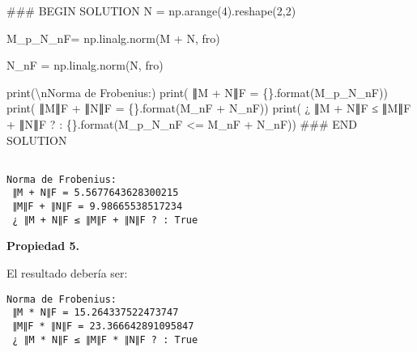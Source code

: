 \documentclass[
  letterpaper,
  DIV=11,
  numbers=noendperiod]{scrreprt}
\newenvironment{Shaded}{\begin{snugshade}}{\end{snugshade}}
\newcommand{\BuiltInTok}[1]{\textcolor[rgb]{0.00,0.23,0.31}{#1}}
\newcommand{\CharTok}[1]{\textcolor[rgb]{0.13,0.47,0.30}{#1}}
\newcommand{\CommentTok}[1]{\textcolor[rgb]{0.37,0.37,0.37}{#1}}
\newcommand{\DecValTok}[1]{\textcolor[rgb]{0.68,0.00,0.00}{#1}}
\newcommand{\NormalTok}[1]{\textcolor[rgb]{0.00,0.23,0.31}{#1}}
\newcommand{\OperatorTok}[1]{\textcolor[rgb]{0.37,0.37,0.37}{#1}}
\newcommand{\RegionMarkerTok}[1]{\textcolor[rgb]{0.00,0.23,0.31}{#1}}
\newcommand{\SpecialCharTok}[1]{\textcolor[rgb]{0.37,0.37,0.37}{#1}}
\newcommand{\StringTok}[1]{\textcolor[rgb]{0.13,0.47,0.30}{#1}}
\begin{document}
\begin{Shaded}
\begin{Highlighting}[]
\CommentTok{\#\#\# }\RegionMarkerTok{BEGIN}\CommentTok{ SOLUTION}
\NormalTok{N }\OperatorTok{=}\NormalTok{ np.arange(}\DecValTok{4}\NormalTok{).reshape(}\DecValTok{2}\NormalTok{,}\DecValTok{2}\NormalTok{)}

\NormalTok{M\_p\_N\_nF}\OperatorTok{=}\NormalTok{ np.linalg.norm(M }\OperatorTok{+}\NormalTok{ N, }\StringTok{\textquotesingle{}fro\textquotesingle{}}\NormalTok{)}

\NormalTok{N\_nF }\OperatorTok{=}\NormalTok{ np.linalg.norm(N, }\StringTok{\textquotesingle{}fro\textquotesingle{}}\NormalTok{)}

\BuiltInTok{print}\NormalTok{(}\StringTok{\textquotesingle{}}\CharTok{\textbackslash{}n}\StringTok{Norma de Frobenius:\textquotesingle{}}\NormalTok{)}
\BuiltInTok{print}\NormalTok{(}\StringTok{\textquotesingle{} ∥M + N∥F = }\SpecialCharTok{\{\}}\StringTok{\textquotesingle{}}\NormalTok{.}\BuiltInTok{format}\NormalTok{(M\_p\_N\_nF))}
\BuiltInTok{print}\NormalTok{(}\StringTok{\textquotesingle{} ∥M∥F + ∥N∥F = }\SpecialCharTok{\{\}}\StringTok{\textquotesingle{}}\NormalTok{.}\BuiltInTok{format}\NormalTok{(M\_nF }\OperatorTok{+}\NormalTok{ N\_nF))}
\BuiltInTok{print}\NormalTok{(}\StringTok{\textquotesingle{} ¿ ∥M + N∥F ≤ ∥M∥F + ∥N∥F ? : }\SpecialCharTok{\{\}}\StringTok{\textquotesingle{}}\NormalTok{.}\BuiltInTok{format}\NormalTok{(M\_p\_N\_nF }\OperatorTok{\textless{}=}\NormalTok{ M\_nF }\OperatorTok{+}\NormalTok{ N\_nF))}
\CommentTok{\#\#\# }\RegionMarkerTok{END}\CommentTok{ SOLUTION}
\end{Highlighting}
\end{Shaded}

\begin{verbatim}

Norma de Frobenius:
 ∥M + N∥F = 5.5677643628300215
 ∥M∥F + ∥N∥F = 9.98665538517234
 ¿ ∥M + N∥F ≤ ∥M∥F + ∥N∥F ? : True
\end{verbatim}

\textbf{Propiedad 5.}

El resultado debería ser:

\begin{verbatim}
Norma de Frobenius:
 ∥M * N∥F = 15.264337522473747
 ∥M∥F * ∥N∥F = 23.366642891095847
 ¿ ∥M * N∥F ≤ ∥M∥F * ∥N∥F ? : True
\end{verbatim}
\end{document}

